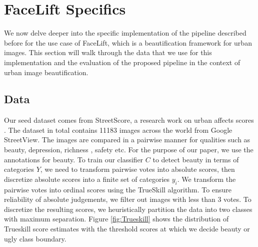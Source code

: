 \section{ FaceLift  Specifics}
We now delve deeper into the specific implementation of the pipeline described before for the use case of FaceLift, which is a beautification framework for urban images. This section will walk through the data that we use for this implementation and the evaluation of the proposed pipeline in the context of urban image beautification.


\subsection{Data }
\label{sec:label}
Our seed dataset comes from StreetScore, a research work on urban affects scores \cite{naik2014streetscore}. The dataset in total contains 11183 images across the world from Google StreetView. The images are compared in a pairwise manner for qualities such as beauty, depression, richness , safety etc. For the purpose of our paper, we use the annotations for beauty. To train our classifier $C$ to detect beauty in terms of categories $Y$, we need to transform pairwise votes into absolute scores, then discretize absolute scores into a finite set of categories $y_i$. We transform the pairwise votes %
into ordinal scores using the TrueSkill \cite{herbrich2007trueskill} algorithm. %
To ensure reliability of absolute judgements, we filter out images with less than 3 votes.
To discretize the resulting scores, we heuristically partition the data into two classes with maximum separation. Figure \ref{fig:Trueskill} shows the distribution of Trueskill score estimates with the threshold scores at which we decide beauty or ugly class boundary. 
 
